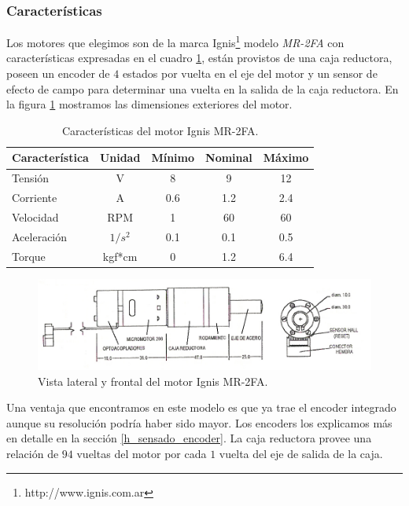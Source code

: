 \subsubsection{Caracter\'isticas}
\label{h_actuadores_motorDC_caracteristicas}

Los motores que elegimos son de la marca Ignis\footnote{http://www.ignis.com.ar} modelo \emph{MR-2FA}
con caracter\'isticas expresadas en el cuadro \ref{hT_motorDC}, est\'an provistos de una caja reductora,
poseen un encoder de $4$ estados por vuelta en el eje del motor y un sensor de efecto de campo para
determinar una vuelta en la salida de la caja reductora.
En la figura \ref{hF_motorDC} mostramos las dimensiones exteriores del motor.

\begin{table}
	\begin{center}
		\begin{tabular}{|l|c|c|c|c|}
			\hline
			Caracter\'istica & Unidad & M\'inimo & Nominal & M\'aximo \\
			\hline
			Tensi\'on & V & 8 & 9 & 12 \\
			Corriente & A & 0.6 & 1.2 & 2.4 \\
			Velocidad & RPM & 1 & 60 & 60 \\
			Aceleraci\'on & $1/s^{2}$ & 0.1 & 0.1 & 0.5 \\
			Torque & kgf*cm & 0 & 1.2 & 6.4 \\
			\hline
		\end{tabular}
	\end{center}
	\caption{Caracter\'isticas del motor Ignis MR-2FA.}
	\label{hT_motorDC}
\end{table}

\begin{figure}[ht]
	\centering
	\includegraphics[scale=1]{figuras/MR2-FA.png}
	\caption{Vista lateral y frontal del motor Ignis MR-2FA.}
	\label{hF_motorDC}
\end{figure}

Una ventaja que encontramos en este modelo es que ya trae el encoder integrado aunque su resoluci\'on podr\'ia haber sido mayor.
Los encoders los explicamos m\'as en detalle en la secci\'on \ref{h_sensado_encoder}.
La caja reductora provee una relaci\'on de $94$ vueltas del motor por cada $1$ vuelta del eje de salida de la caja.

